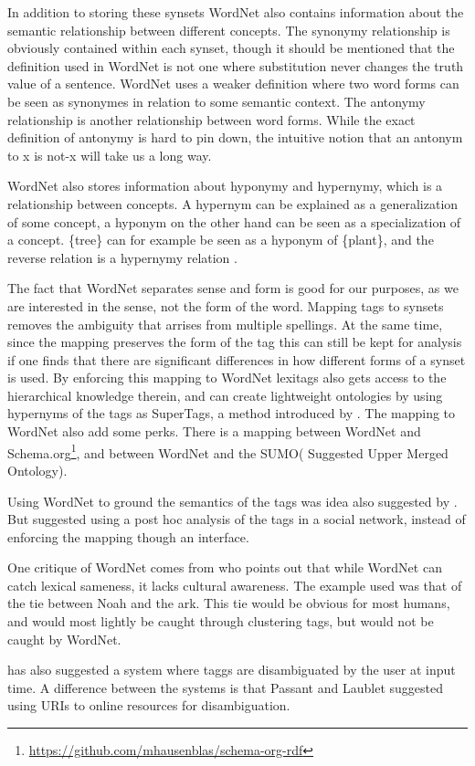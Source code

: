 In addition to storing these synsets WordNet also contains information about the semantic relationship between different concepts. 
The synonymy relationship is obviously contained within each synset, 
though it should be mentioned that the definition used in WordNet is not one where substitution never changes the truth value of a sentence. 
WordNet uses a weaker definition where two word forms can be seen as synonymes in relation to some semantic context. 
The antonymy relationship is another relationship between word forms. While the exact definition of antonymy is hard to pin down, the intuitive notion that an antonym to x is not-x will take us a long way\citep{Miller1990}.

WordNet also stores information about hyponymy and hypernymy, which is a relationship between concepts.
 A hypernym can be explained as a generalization of some concept, a hyponym on the other hand can be seen as a specialization of a concept. 
 \{tree\} can for example be seen as a hyponym of \{plant\}, and the reverse relation is a hypernymy relation \citep{Veres2010}.

The fact that WordNet separates sense and form is good for our purposes, as we are interested in the sense, not the form of the word. 
Mapping tags to synsets removes the ambiguity that arrises from multiple spellings. 
At the same time, since the mapping preserves the form of the tag this can still be kept for analysis if one finds that there are significant differences in how different forms of a synset is used\citep{Veres2011}.
By enforcing this mapping to WordNet lexitags also gets access to the hierarchical knowledge therein, and can create lightweight ontologies by using hypernyms of the tags as SuperTags, a method introduced by \citet{Veres2010}.
The mapping to WordNet also add some perks. There is a mapping between WordNet and Schema.org\footnote{\url{https://github.com/mhausenblas/schema-org-rdf}}, and between WordNet and the SUMO( Suggested Upper Merged Ontology)\citep{Niles2003}.

Using WordNet to ground the semantics of the tags was idea also suggested by \citet{Cattuto2008}. But \citet{Cattuto2008} suggested using a post hoc analysis of the tags in a social network, instead of enforcing the mapping though an interface.

One critique of WordNet comes from \citet{Mika2005} who points out that while WordNet can catch lexical sameness, it lacks cultural awareness. The example used was that of the tie between Noah and the ark.
This tie would be obvious for most humans, and would most lightly be caught through clustering tags, but would not be caught by WordNet.

\citet{Passant2008} has also suggested a system where taggs are disambiguated by the user at input time. A difference between the systems is that Passant and Laublet suggested using URIs to online resources for disambiguation.
